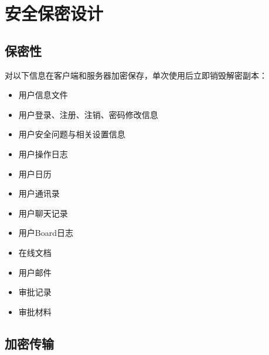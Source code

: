 \chapter{\color{red} 安全保密设计}
    \section{\color{red} 保密性}
    对以下信息在客户端和服务器加密保存，单次使用后立即销毁解密副本：
    \begin{itemize}
        \item 用户信息文件
        \item 用户登录、注册、注销、密码修改信息
        \item 用户安全问题与相关设置信息
        \item 用户操作日志
        \item 用户日历
        \item 用户通讯录
        \item 用户聊天记录
        \item 用户Board日志
        \item 在线文档
        \item 用户邮件
        \item 审批记录
        \item 审批材料
    \end{itemize}
    \section{加密传输}
